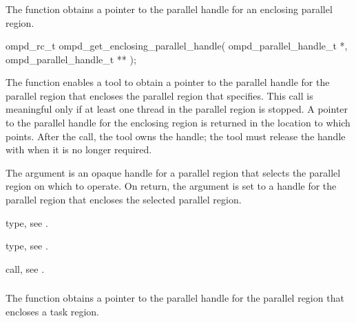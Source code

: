 \subsubsection{}
\label{subsubsubsec:ompd_get_enclosing_parallel_handle}

\summary
The   function obtains a pointer 
to the parallel handle for an enclosing parallel region.

\format
\begin{cspecific}
\begin{ompSyntax}
ompd_rc_t ompd_get_enclosing_parallel_handle(
  ompd_parallel_handle_t *,
  ompd_parallel_handle_t **
);
\end{ompSyntax}
\end{cspecific}

\descr
The   function enables a tool 
to obtain a pointer to the parallel handle for the parallel region that
encloses the parallel region that  specifies. This 
call is meaningful only if at least one thread in the parallel region 
is stopped. A pointer to the parallel handle for the enclosing region 
is returned in the location to which 
points. After the call, the tool owns the handle; the tool must release the 
handle with  when it is no longer required.

\argdesc
The  argument is an opaque handle for a parallel 
region that selects the parallel region on which to operate. On return, 
the  argument is set to a handle for the 
parallel region that encloses the selected parallel region.

\begin{crossrefs}
\item {} type, 
see .

\item {} type, see .

\item {} call, 
see .
\end{crossrefs}



\subsubsection{}
\label{subsubsubsec:ompd_get_task_parallel_handle}
\summary
The   function obtains a pointer to 
the parallel handle for the parallel region that encloses a task region.

